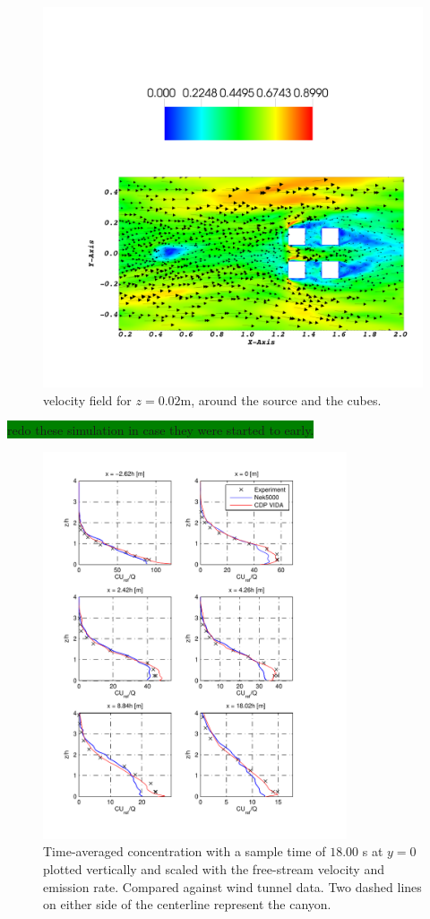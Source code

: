 %
\begin{figure}[h]
	\centerline{\includegraphics[width=1.2\textwidth]{Figures/vel_field.png}}
	\caption{velocity field for $z= 0.02$m, around the source and the cubes.}
	\label{fig:vel_field}
\end{figure}
%

\colorbox{green}{redo these simulation in case they were started to early.}
%
\begin{figure}[h]
	\centering
	\includegraphics[width=0.8\textwidth]{Figures/NekcV.pdf}
	\caption{Time-averaged concentration with a sample time of $18.00$ s at $y = 0$ plotted
    vertically and scaled 
	with the free-stream velocity and emission rate. Compared against wind tunnel data.
Two dashed lines on either side of the centerline represent the canyon.}
	\label{fig:cVfilter}
\end{figure}
%

